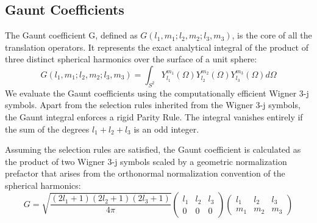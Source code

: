 \subsection{Gaunt Coefficients}
The Gaunt coefficient G, defined as $G(l_1, m_1; l_2, m_2; l_3, m_3)$, is the core of all the translation operators. It represents the exact analytical integral of the product of three distinct spherical harmonics over the surface of a unit sphere:
\begin{equation}
    G(l_1, m_1; l_2, m_2; l_3, m_3) = \int_{S^2} Y_{l_1}^{m_1}(\Omega) Y_{l_2}^{m_2}(\Omega) Y_{l_3}^{m_3}(\Omega) d\Omega
\end{equation}
We evaluate the Gaunt coefficients using the computationally efficient Wigner 3-j symbols. Apart from the selection rules inherited from the Wigner 3-j symbols, the Gaunt integral enforces a rigid Parity Rule. The integral vanishes entirely if the sum of the degrees $l_1 + l_2 + l_3$ is an odd integer.

Assuming the selection rules are satisfied, the Gaunt coefficient is calculated as the product of two Wigner 3-j symbols scaled by a geometric normalization prefactor that arises from the orthonormal normalization convention of the spherical harmonics:
\begin{equation}
    G = \sqrt{\frac{(2l_1 + 1)(2l_2 + 1)(2l_3 + 1)}{4\pi}} \begin{pmatrix} l_1 & l_2 & l_3 \\ 0 & 0 & 0 \end{pmatrix} \begin{pmatrix} l_1 & l_2 & l_3 \\ m_1 & m_2 & m_3 \end{pmatrix}
\end{equation}